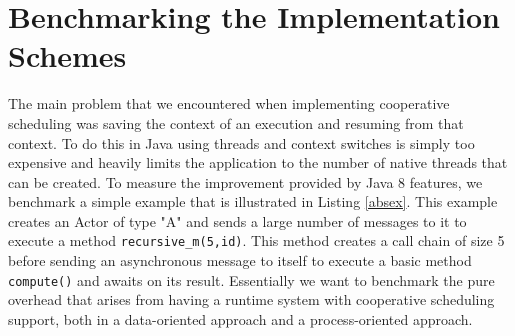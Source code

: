 \section{Benchmarking the Implementation Schemes}
\label{bench}
The main problem that we encountered  when implementing cooperative scheduling was saving the context of an execution and resuming from that context. To do this in Java using threads and context switches is simply too expensive and heavily limits the application to the number of native threads that can be created. To measure the improvement provided by Java 8 features, we benchmark a simple example that is illustrated in Listing \ref{absex}. This example creates an Actor of type "A" and sends a large number of messages to it to execute a method \lstinline|recursive_m(5,id)|. This method creates a call chain of size 5 before sending an asynchronous message to itself to execute a basic method \lstinline|compute()| and awaits on its result. Essentially we want to benchmark the pure overhead that arises from having a runtime system with cooperative scheduling support, both in a data-oriented approach and a process-oriented approach.




